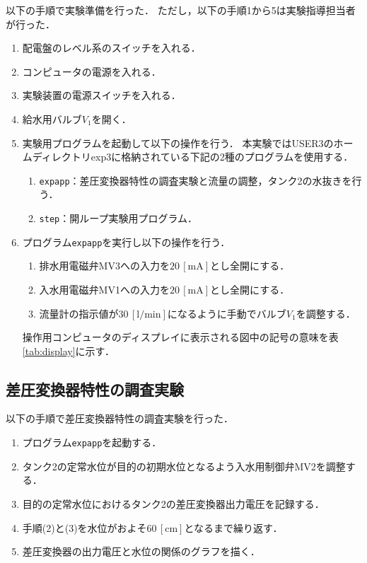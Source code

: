 \documentclass[11pt,a4paper]{jsarticle}
\begin{document}
以下の手順で実験準備を行った．
ただし，以下の手順1から5は実験指導担当者が行った．
\begin{enumerate}
  \item 配電盤のレベル系のスイッチを入れる．
  \item コンピュータの電源を入れる．
  \item 実験装置の電源スイッチを入れる．
  \item 給水用バルブ$V_1$を開く．
  \item 実験用プログラムを起動して以下の操作を行う．
        本実験ではUSER3のホームディレクトリexp3に格納されている下記の2種のプログラムを使用する．
    \begin{enumerate}
      \setlength{\leftskip}{5mm}
      \item \texttt{expapp}：差圧変換器特性の調査実験と流量の調整，タンク2の水抜きを行う．
      \item \texttt{step}：開ループ実験用プログラム．
    \end{enumerate}
  \item プログラム\texttt{expapp}を実行し以下の操作を行う．
    \begin{enumerate}
      \setlength{\leftskip}{5mm}
      \item 排水用電磁弁MV3への入力を$20 \, \mathrm{[mA]}$とし全開にする．
      \item 入水用電磁弁MV1への入力を$20 \, \mathrm{[mA]}$とし全開にする．
      \item 流量計の指示値が$30 \, \mathrm{[l/min]}$になるように手動でバルブ$V_1$を調整する．
    \end{enumerate}
    操作用コンピュータのディスプレイに表示される図中の記号の意味を表\ref{tab:display}に示す．
\end{enumerate}



\subsection{差圧変換器特性の調査実験}

以下の手順で差圧変換器特性の調査実験を行った．
\begin{enumerate}
  \item プログラム\texttt{expapp}を起動する．
  \item タンク2の定常水位が目的の初期水位となるよう入水用制御弁MV2を調整する．
  \item 目的の定常水位におけるタンク2の差圧変換器出力電圧を記録する．
  \item 手順(2)と(3)を水位がおよそ$60 \, \mathrm{[cm]}$となるまで繰り返す．
  \item 差圧変換器の出力電圧と水位の関係のグラフを描く．
\end{enumerate}
\end{document}
